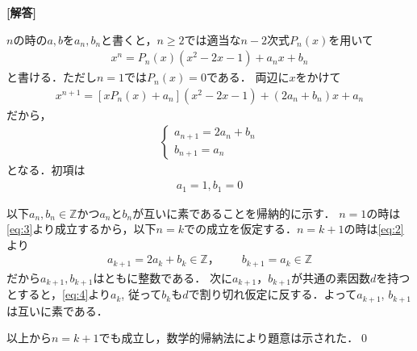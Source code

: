 \documentclass[../../main.tex]{subfiles}
\begin{document}
\begin{oframed}
  
\end{oframed}

{\bf [解答]}

$n$の時の$a,b$を$a_n,b_n$と書くと，$n \ge 2$では適当な$n-2$次式$P_n(x)$を用いて
\begin{align}
  x^n=P_{n}(x)(x^2-2x-1)+a_nx+b_n \label{eq:1}
\end{align}
と書ける．ただし$n=1$では$P_{n}(x)=0$である．
両辺に$x$をかけて
\begin{align}
  x^{n+1}=\left[xP_{n}(x)+a_n\right](x^2-2x-1)+(2a_n+b_n)x+a_n
\end{align}
だから，
\begin{align}
  \begin{cases}
    a_{n+1} = 2a_n+b_n \\
    b_{n+1} = a_n
  \end{cases} \label{eq:2}
\end{align}
となる．初項は
\begin{align}
  a_1 = 1, b_1 = 0 \label{eq:3}
\end{align}

以下$a_n,b_n\in\mathbb{Z}$かつ$a_n$と$b_n$が互いに素であることを帰納的に示す．
$n=1$の時は\cref{eq:3}より成立するから，以下$n=k$での成立を仮定する．$n=k+1$の時は\cref{eq:2}より
\begin{align}
  a_{k+1}=2a_k+b_k\in\mathbb{Z}，\qquad b_{k+1}=a_k \in\mathbb{Z} \label{eq:4}
\end{align}
だから$a_{k+1},b_{k+1}$はともに整数である．
次に$a_{k+1}$，$b_{k+1}$が共通の素因数$d$を持つとすると，\cref{eq:4}より$a_k$, 従って$b_k$も$d$で割り切れ仮定に反する．よって$a_{k+1}$, $b_{k+1}$は互いに素である．

以上から$n=k+1$でも成立し，数学的帰納法により題意は示された．\qed

\newpage
\end{document}
